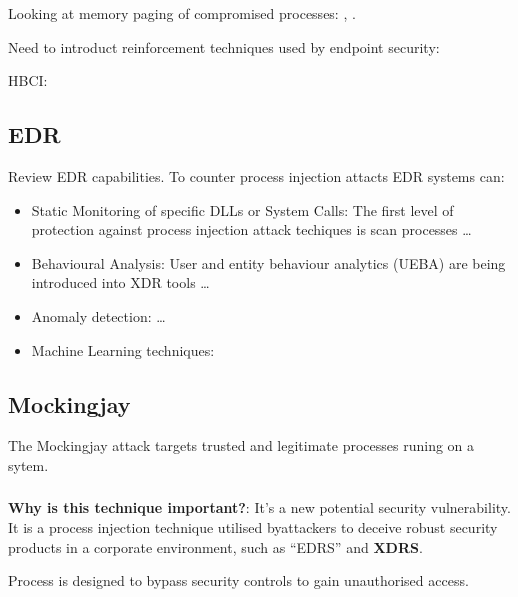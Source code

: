 \documentclass{article}
\begin{document}
Looking at memory paging of compromised processes: , \autocite{Pek:2016}.


Need to introduct reinforcement techniques used by endpoint security:

HBCI:

\subsection{EDR}

Review EDR capabilities.  To counter process injection attacts EDR systems can:

\begin{itemize}
\item Static Monitoring of specific DLLs or System Calls: The first level of protection against process injection attack techiques is
  scan processes \ldots
\item Behavioural Analysis: User and entity behaviour analytics (UEBA) are being introduced into XDR tools \ldots
\item Anomaly detection: \autocite{Pek:2016} \ldots
\item Machine Learning techniques: \autocite{Wang:2022}
\end{itemize}

\subsubsection{}
\textcite{Wang:2022}

\subsection{Mockingjay}

The Mockingjay  attack targets trusted and legitimate processes runing on a sytem.  

\subsubsection{}
\textcite{Peixoto:2023}

\textbf{Why is this technique important?}: It's a new potential security vulnerability. It is a process injection
technique utilised byattackers to deceive robust security products in a corporate environment, such as ``EDRS'' and \textbf{XDRS}.

Process is designed to bypass security controls to gain unauthorised access.
\end{document}
